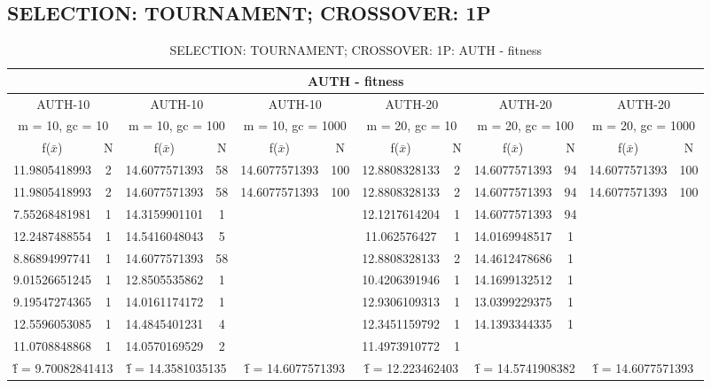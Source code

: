 \subsection{SELECTION: TOURNAMENT; CROSSOVER: 1P}
\begin{table}[H]
	\centering
	\caption{SELECTION: TOURNAMENT; CROSSOVER: 1P: AUTH - fitness}
	\begin{adjustbox}{width=1\textwidth}
		\begin{tabular}{ |c|c||c|c||c|c||c|c||c|c||c|c| }
			\hline
			\multicolumn{12}{|c|}{AUTH - fitness} \\
			\hline
			\multicolumn{2}{|c||}{AUTH-10} & \multicolumn{2}{c||}{AUTH-10} & \multicolumn{2}{c||}{AUTH-10} & \multicolumn{2}{c||}{AUTH-20} & \multicolumn{2}{c||}{AUTH-20} & \multicolumn{2}{c|}{AUTH-20}\\
			\hline
			\multicolumn{2}{|c||}{m = 10, gc = 10} & \multicolumn{2}{c||}{m = 10, gc = 100} & \multicolumn{2}{c||}{m = 10, gc = 1000} & \multicolumn{2}{c||}{m = 20, gc = 10} & \multicolumn{2}{c||}{m = 20, gc = 100} & \multicolumn{2}{c|}{m = 20, gc = 1000}\\
			\hline
			f($\bar{x}$) & N & f($\bar{x}$) & N & f($\bar{x}$) & N & f($\bar{x}$) & N & f($\bar{x}$) & N & f($\bar{x}$) & N\\
			\hline
			\hline
			11.9805418993 & 2 & 14.6077571393 & 58 & 14.6077571393 & 100 & 12.8808328133 & 2 & 14.6077571393 & 94 & 14.6077571393 & 100\\
			\hline
			11.9805418993 & 2 & 14.6077571393 & 58 & 14.6077571393 & 100 & 12.8808328133 & 2 & 14.6077571393 & 94 & 14.6077571393 & 100\\
			7.55268481981 & 1 & 14.3159901101 & 1 &   &   & 12.1217614204 & 1 & 14.6077571393 & 94 &   &  \\
			12.2487488554 & 1 & 14.5416048043 & 5 &   &   & 11.062576427 & 1 & 14.0169948517 & 1 &   &  \\
			8.86894997741 & 1 & 14.6077571393 & 58 &   &   & 12.8808328133 & 2 & 14.4612478686 & 1 &   &  \\
			9.01526651245 & 1 & 12.8505535862 & 1 &   &   & 10.4206391946 & 1 & 14.1699132512 & 1 &   &  \\
			9.19547274365 & 1 & 14.0161174172 & 1 &   &   & 12.9306109313 & 1 & 13.0399229375 & 1 &   &  \\
			12.5596053085 & 1 & 14.4845401231 & 4 &   &   & 12.3451159792 & 1 & 14.1393344335 & 1 &   &  \\
			11.0708848868 & 1 & 14.0570169529 & 2 &   &   & 11.4973910772 & 1 &   &   &   &  \\
			\hline
			\multicolumn{2}{|c||}{\^{f} = 9.70082841413} & \multicolumn{2}{c||}{\^{f} = 14.3581035135} & \multicolumn{2}{c||}{\^{f} = 14.6077571393} & \multicolumn{2}{c||}{\^{f} = 12.223462403} & \multicolumn{2}{c||}{\^{f} = 14.5741908382} & \multicolumn{2}{c|}{\^{f} = 14.6077571393}\\
			\hline
		\end{tabular}
	\end{adjustbox}
\end{table}
